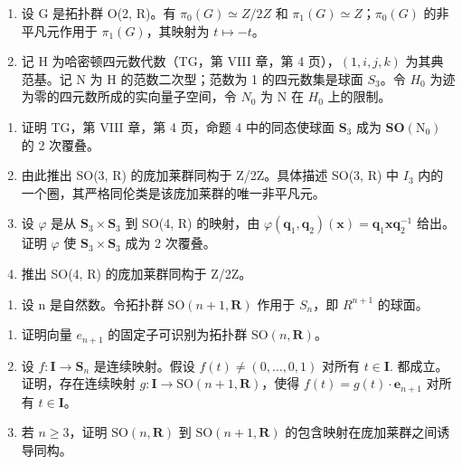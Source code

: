 \exercisegroup

\begin{enumerate}
\def\labelenumi{\arabic{enumi})}
\item
  设 G 是拓扑群 O(2, R)。有 \(\pi_{0}(G) \simeq Z/2Z\) 和 \(\pi_{1}(G) \simeq Z\)；\(\pi_{0}(G)\) 的非平凡元作用于 \(\pi_{1}(G)\)，其映射为 \(t \mapsto -t\)。
\item
  记 H 为哈密顿四元数代数（TG，第 VIII 章，第 4 页），\((1, i, j, k)\) 为其典范基。记 N 为 H 的范数二次型；范数为 1 的四元数集是球面 \(S_{3}\)。令 \(H_{0}\) 为迹为零的四元数所成的实向量子空间，令 \(N_{0}\) 为 N 在 \(H_{0}\) 上的限制。
\end{enumerate}

\begin{enumerate}
\def\labelenumi{\alph{enumi})}
\item
  证明 TG，第 VIII 章，第 4 页，命题 4 中的同态使球面 \(\mathbf{S}_3\) 成为 \(\mathbf{SO}(\mathrm{N}_0)\) 的 2 次覆叠。
\item
  由此推出 SO(3, R) 的庞加莱群同构于 Z/2Z。具体描述 SO(3, R) 中 \(I_{3}\) 内的一个圈，其严格同伦类是该庞加莱群的唯一非平凡元。
\item
  设 \(\varphi\) 是从 \(\mathbf{S}_3 \times \mathbf{S}_3\) 到 SO(4, R) 的映射，由 \(\varphi(\mathbf{q}_1, \mathbf{q}_2)(\mathbf{x}) = \mathbf{q}_1 \mathbf{x} \mathbf{q}_2^{-1}\) 给出。证明 \(\varphi\) 使 \(\mathbf{S}_3 \times \mathbf{S}_3\) 成为 2 次覆叠。
\item
  推出 SO(4, R) 的庞加莱群同构于 Z/2Z。
\end{enumerate}

\begin{enumerate}
\def\labelenumi{\arabic{enumi})}
\setcounter{enumi}{2}
\tightlist
\item
  设 n 是自然数。令拓扑群 \(\mathrm{SO}(n+1,\mathbf{R})\) 作用于 \(S_{n}\)，即 \(R^{n+1}\) 的球面。
\end{enumerate}

\begin{enumerate}
\def\labelenumi{\alph{enumi})}
\item
  证明向量 \(e_{n+1}\) 的固定子可识别为拓扑群 \(\mathrm{SO}(n,\mathbf{R})\)。
\item
  设 \(f \colon \mathbf{I} \to \mathbf{S}_n\) 是连续映射。假设 \(f(t) \neq (0, \ldots, 0, 1)\) 对所有 \(t \in \mathbf{I} .\) 都成立。证明，存在连续映射 \(g \colon \mathbf{I} \to \mathrm{SO}(n + 1, \mathbf{R})\)，使得 \(f(t) = g(t) \cdot \mathbf{e}_{n+1}\) 对所有 \(t \in \mathbf{I} \)。
\item
  若 \(n \geqslant 3\)，证明 \(\mathrm{SO}(n, \mathbf{R})\) 到 \(\mathrm{SO}(n+1, \mathbf{R})\) 的包含映射在庞加莱群之间诱导同构。
\end{enumerate}


